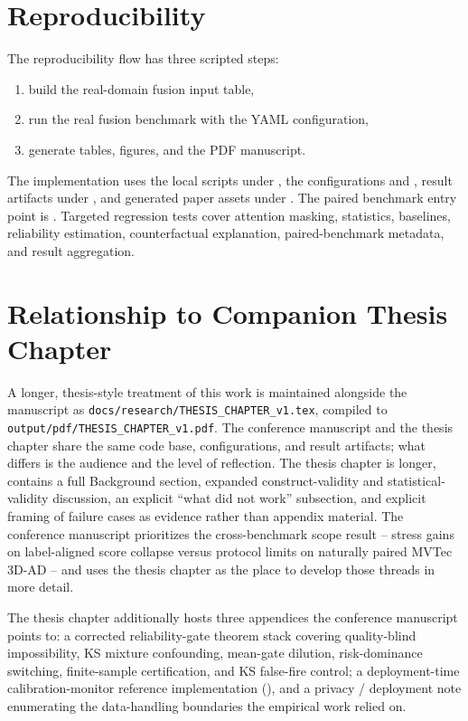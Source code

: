 \documentclass[10pt,conference]{IEEEtran}
\begin{document}
\section{Reproducibility}
The reproducibility flow has three scripted steps:
\begin{enumerate}
  \item build the real-domain fusion input table,
  \item run the real fusion benchmark with the YAML configuration,
  \item generate tables, figures, and the PDF manuscript.
\end{enumerate}
The implementation uses the local scripts under , the
configurations  and
, result artifacts under
, and generated paper assets under
. The paired benchmark entry point is
. Targeted regression
tests cover attention masking, statistics, baselines, reliability estimation,
counterfactual explanation, paired-benchmark metadata, and result aggregation.

\section{Relationship to Companion Thesis Chapter}
\label{sec:thesis-link}
A longer, thesis-style treatment of this work is maintained alongside the
manuscript as \texttt{docs/research/THESIS\_CHAPTER\_v1.tex}, compiled to
\texttt{output/pdf/THESIS\_CHAPTER\_v1.pdf}. The conference manuscript and the
thesis chapter share the same code base, configurations, and result
artifacts; what differs is the audience and the level of reflection. The
thesis chapter is longer, contains a full Background section, expanded
construct-validity and statistical-validity discussion, an explicit
``what did not work'' subsection, and explicit framing of failure cases as
evidence rather than appendix material. The conference manuscript prioritizes
the cross-benchmark scope result -- stress gains on label-aligned score
collapse versus protocol limits on naturally paired MVTec 3D-AD -- and uses the
thesis chapter as the place to develop those threads in more detail.

The thesis chapter additionally hosts three appendices the conference
manuscript points to: a corrected reliability-gate theorem stack covering
quality-blind impossibility, KS mixture confounding, mean-gate dilution,
risk-dominance switching, finite-sample certification, and KS false-fire
control; a deployment-time calibration-monitor reference implementation
(), and a privacy / deployment
note enumerating the data-handling boundaries the empirical work relied
on.
\end{document}
